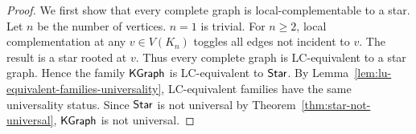 \begin{proof}
We first show that every complete graph is local-complementable to a star. Let $n$ be the number of vertices. $n=1$ is trivial. For $n \geq 2$, local complementation at any $v \in V(K_n)$ toggles all edges not incident to $v$. The result is a star rooted at $v$. Thus every complete graph is LC-equivalent to a star graph. Hence the family
$\mathsf{KGraph}$ is LC-equivalent to $\mathsf{Star}$. By
Lemma~\ref{lem:lu-equivalent-families-universality}, LC-equivalent families have the
same universality status. Since $\mathsf{Star}$ is not universal by
Theorem~\ref{thm:star-not-universal}, $\mathsf{KGraph}$ is not universal.
\end{proof}